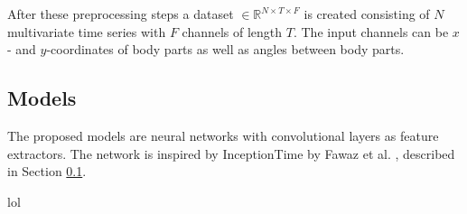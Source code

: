 After these preprocessing steps a dataset $\in \mathbb{R}^{N \times T \times F}$ is created consisting of $N$ multivariate time series with $F$ channels of length $T$. The input channels can be $x$- and $y$-coordinates of body parts as well as angles between body parts.

\subsection{Models}
The proposed models are neural networks with convolutional layers as feature extractors. The network is inspired by InceptionTime by Fawaz et al. \cite{IsmailFawaz2020}, described in Section \ref{}.

\cite{Fauvel2020}
lol
